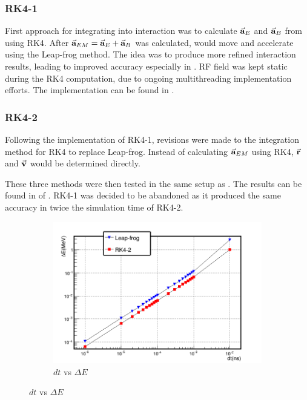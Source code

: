 \documentclass[a4paper,oneside,12pt]{report}
\numberwithin{equation}{chapter}
\begin{document}
{\subsubsection{\hspace{4pt}RK4-1}\hspace{4pt}
First approach for integrating  into \eEM interaction was to calculate $\vec{\textbf{a}}_{E}$ and $\vec{\textbf{a}}_{B}$ from  using RK4.
After $\vec{\textbf{a}}_{EM} = \vec{\textbf{a}}_{E} + \vec{\textbf{a}}_{B}$ was calculated, \e would move and accelerate using the Leap-frog method. 
The idea was to produce more refined interaction results, leading to improved accuracy especially in \eB.
RF field was kept static during the RK4 computation, due to ongoing multithreading implementation efforts. 
The implementation can be found in .
\subsubsection{\hspace{4pt}RK4-2}\hspace{4pt}
Following the implementation of RK4-1, revisions were made to the integration method for RK4 to replace Leap-frog.
Instead of calculating $\vec{\textbf{a}}_{EM}$ using RK4, $\vec{\textbf{r}}$ and $\vec{\textbf{v}}$ would be determined directly.

These three methods were then tested in the same setup as . The results can be found in  of .
RK4-1 was decided to be abandoned as it produced the same accuracy in twice the simulation time of RK4-2.

\iffalse \begin{figure}
    \centering
    \begin{subfigure}{0.8\textwidth}
        \centering
        \includegraphics[width=\linewidth]{./figures/analiz/mag_lf_rk2_dt-E.png}
        \caption*{$dt$ vs $\Delta E$}
    \end{subfigure}
    

\end{figure}}
\end{document}
